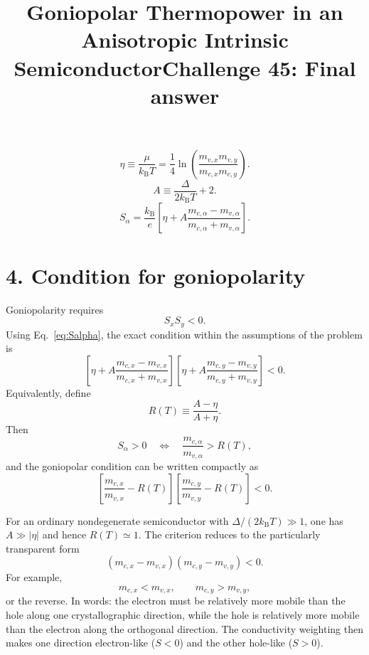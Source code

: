 \documentclass[11pt]{article}
\title{\vspace{-1.2cm}Goniopolar Thermopower in an Anisotropic Intrinsic Semiconductor}
\author{}
\date{}
\title{Challenge 45: Final answer}
\author{}
\newcommand{\kb}{k_{\mathrm B}}
\begin{document}
\maketitle
\begin{equation}
\eta\equiv\frac{\mu}{\kb T}
=\frac14\ln\!\left(
\frac{m_{v,x}m_{v,y}}
     {m_{c,x}m_{c,y}}
\right).
\label{eq:eta}
\end{equation}
\begin{equation}
A\equiv \frac{\Delta}{2\kb T}+2.
\label{eq:A}
\end{equation}
\begin{equation}
\boxed{
S_\alpha
=\frac{\kb}{e}
\left[
\eta
+A\frac{m_{c,\alpha}-m_{v,\alpha}}
        {m_{c,\alpha}+m_{v,\alpha}}
\right].
}
\label{eq:Salpha}
\end{equation}
\section*{4. Condition for goniopolarity}

Goniopolarity requires
\begin{equation}
\boxed{S_xS_y<0.}
\end{equation}
Using Eq.~\eqref{eq:Salpha}, the exact condition within the assumptions of the problem is
\begin{equation}
\boxed{
\left[
\eta+A\frac{m_{c,x}-m_{v,x}}{m_{c,x}+m_{v,x}}
\right]
\left[
\eta+A\frac{m_{c,y}-m_{v,y}}{m_{c,y}+m_{v,y}}
\right]<0.
}
\label{eq:exactcondition}
\end{equation}
Equivalently, define
\begin{equation}
R(T)\equiv\frac{A-\eta}{A+\eta}.
\end{equation}
Then
\begin{equation}
S_\alpha>0
\quad\Longleftrightarrow\quad
\frac{m_{c,\alpha}}{m_{v,\alpha}}>R(T),
\end{equation}
and the goniopolar condition can be written compactly as
\begin{equation}
\boxed{
\left[
\frac{m_{c,x}}{m_{v,x}}-R(T)
\right]
\left[
\frac{m_{c,y}}{m_{v,y}}-R(T)
\right]<0.
}
\label{eq:Rcondition}
\end{equation}

For an ordinary nondegenerate semiconductor with $\Delta/(2\kb T)\gg1$, one has $A\gg|\eta|$ and hence $R(T)\simeq1$. The criterion reduces to the particularly transparent form
\begin{equation}
\boxed{
(m_{c,x}-m_{v,x})(m_{c,y}-m_{v,y})<0.
}
\label{eq:simplecondition}
\end{equation}
For example,
\begin{equation}
\boxed{
 m_{c,x}<m_{v,x},
 \qquad
 m_{c,y}>m_{v,y},
}
\end{equation}
or the reverse. In words: the electron must be relatively more mobile than the hole along one crystallographic direction, while the hole is relatively more mobile than the electron along the orthogonal direction. The conductivity weighting then makes one direction electron-like ($S<0$) and the other hole-like ($S>0$).
\end{document}
